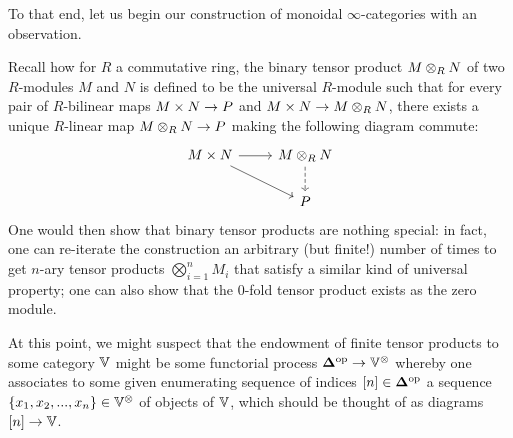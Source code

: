                 To that end, let us begin our construction of monoidal $\infty$-categories with an observation.
                \begin{remark} \label{remark: monoidal_op_fibrations}
                    Recall how for $R$ a commutative ring, the binary tensor product $M \tensor_R N$ of two $R$-modules $M$ and $N$ is defined to be the universal $R$-module such that for every pair of $R$-bilinear maps $M \x N \to P$ and $M \x N \to M \tensor_R N$, there exists a unique $R$-linear map $M \tensor_R N \to P$ making the following diagram commute:
                        $$
                            \begin{tikzcd}
                            	{M \x N} & {M \tensor_R N} \\
                            	& P
                            	\arrow[from=1-1, to=1-2]
                            	\arrow[dashed, from=1-2, to=2-2]
                            	\arrow[from=1-1, to=2-2]
                            \end{tikzcd}
                        $$
                    One would then show that binary tensor products are nothing special: in fact, one can re-iterate the construction an arbitrary (but finite!) number of times to get $n$-ary tensor products $\bigotimes_{i = 1}^n M_i$ that satisfy a similar kind of universal property; one can also show that the $0$-fold tensor product exists as the zero module. 
                    
                    At this point, we might suspect that the endowment of finite tensor products to some category $\mathbb{V}$ might be some functorial process $\simp^{\op} \to \V^{\tensor}$ whereby one associates to some given enumerating sequence of indices $[n] \in \mathbf{\Delta}^{\mathrm{op}}$ a sequence $\{x_1, x_2, ..., x_n\} \in \V^{\tensor}$ of objects of $\mathbb{V}$, which should be thought of as diagrams $[n] \to \mathbb{V}$.
                \end{remark}
                
